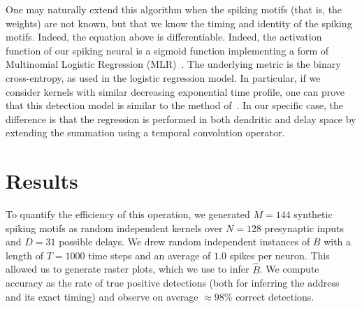 \documentclass[runningheads]{llncs}
\newcommand{\presynaddr}{a} %
\newcommand{\postsynaddr}{b} %
\newcommand{\arank}{r} %
\newcommand{\bias}{b} %
\newcommand{\synapse}{\mathcal{S}} %
\newcommand{\activeweights}{\mathcal{W}}
\newcommand{\timev}{t} %
\newcommand{\Nclass}{N_\text{class}} %
\newcommand{\Nspeed}{N_v}
\begin{document}
One may naturally extend this algorithm when the spiking motifs (that is, the weights) are not known, but that we know the timing and identity of the spiking motifs. Indeed, the equation above is differentiable. Indeed, the activation function of our spiking neural is a sigmoid function implementing a form of  Multinomial Logistic Regression (MLR)~\cite{grimaldi_learning_2022}.  
The underlying metric is the binary cross-entropy, as used in the logistic regression model. In particular, if we consider kernels with similar decreasing exponential time profile, one can prove that this detection model is similar to the method of~\cite{berens_fast_2012}. In our specific case, the difference is that the regression is performed in both dendritic and delay space by extending the summation using a temporal convolution operator. 

%
%
%
\section{Results}
%
To quantify the efficiency of this operation, we generated $M=144$ synthetic spiking motifs as random independent kernels over $N=128$ presynaptic inputs and $D=31$ possible delays. We drew random independent instances of $B$ with a length of $T=1000$ time steps and an average of $1.0$ spikes per neuron. This allowed us to generate raster plots, which we use to infer $\hat{B}$. We compute accuracy as the rate of true positive detections (both for inferring the address and its exact timing) and observe on average $\approx 98\%$ correct detections.
\end{document}
